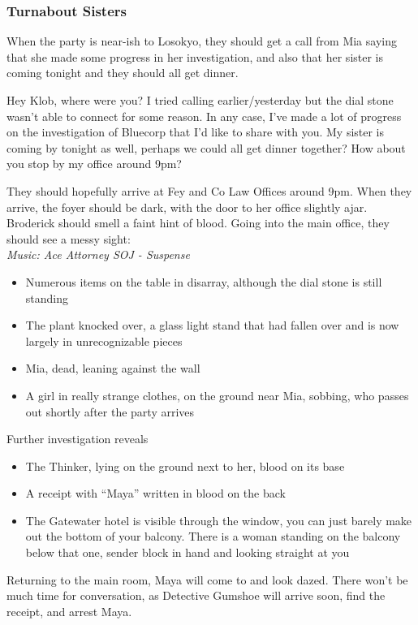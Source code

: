 \subsubsection{Turnabout Sisters}
When the party is near-ish to Losokyo, they should get a call from Mia saying that she made some progress in her investigation, and also that her sister is coming tonight and they should all get dinner.
\begin{center}
Hey Klob, where were you? I tried calling earlier/yesterday but the dial stone wasn't able to connect for some reason. In any case, I've made a lot of progress on the investigation of Bluecorp that I'd like to share with you. My sister is coming by tonight as well, perhaps we could all get dinner together? How about you stop by my office around 9pm?
\end{center}

They should hopefully arrive at Fey and Co Law Offices around 9pm. When they arrive, the foyer should be dark, with the door to her office slightly ajar. Broderick should smell a faint hint of blood. Going into the main office, they should see a messy sight:\\
\textit{Music: Ace Attorney SOJ - Suspense}
\begin{itemize}
\item Numerous items on the table in disarray, although the dial stone is still standing
\item The plant knocked over, a glass light stand that had fallen over and is now largely in unrecognizable pieces
\item Mia, dead, leaning against the wall
\item A girl in really strange clothes, on the ground near Mia, sobbing, who passes out shortly after the party arrives
\end{itemize}
Further investigation reveals
\begin{itemize}
\item The Thinker, lying on the ground next to her, blood on its base
\item A receipt with ``Maya'' written in blood on the back
\item The Gatewater hotel is visible through the window, you can just barely make out the bottom of your balcony. There is a woman standing on the balcony below that one, sender block in hand and looking straight at you
\end{itemize}
Returning to the main room, Maya will come to and look dazed. There won't be much time for conversation, as Detective Gumshoe will arrive soon, find the receipt, and arrest Maya.




